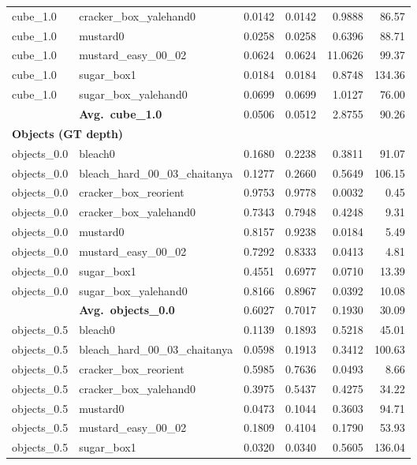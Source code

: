 \begin{longtable}{llrrrr}
  cube_1.0 & cracker\_box\_yalehand0 & 0.0142 & 0.0142 & 0.9888 & 86.57 \\
  cube_1.0 & mustard0 & 0.0258 & 0.0258 & 0.6396 & 88.71 \\
  cube_1.0 & mustard\_easy\_00\_02 & 0.0624 & 0.0624 & 11.0626 & 99.37 \\
  cube_1.0 & sugar\_box1 & 0.0184 & 0.0184 & 0.8748 & 134.36 \\
  cube_1.0 & sugar\_box\_yalehand0 & 0.0699 & 0.0699 & 1.0127 & 76.00 \\
  \cmidrule{2-6}
  & \textbf{Avg.~cube_1.0} & 0.0506 & 0.0512 & 2.8755 & 90.26 \\
  \midrule
\multicolumn{6}{l}{\textbf{Objects (GT depth)}} \\
\midrule
  objects_0.0 & bleach0 & 0.1680 & 0.2238 & 0.3811 & 91.07 \\
  objects_0.0 & bleach\_hard\_00\_03\_chaitanya & 0.1277 & 0.2660 & 0.5649 & 106.15 \\
  objects_0.0 & cracker\_box\_reorient & 0.9753 & 0.9778 & 0.0032 & 0.45 \\
  objects_0.0 & cracker\_box\_yalehand0 & 0.7343 & 0.7948 & 0.4248 & 9.31 \\
  objects_0.0 & mustard0 & 0.8157 & 0.9238 & 0.0184 & 5.49 \\
  objects_0.0 & mustard\_easy\_00\_02 & 0.7292 & 0.8333 & 0.0413 & 4.81 \\
  objects_0.0 & sugar\_box1 & 0.4551 & 0.6977 & 0.0710 & 13.39 \\
  objects_0.0 & sugar\_box\_yalehand0 & 0.8166 & 0.8967 & 0.0392 & 10.08 \\
  \cmidrule{2-6}
  & \textbf{Avg.~objects_0.0} & 0.6027 & 0.7017 & 0.1930 & 30.09 \\
  \midrule
  objects_0.5 & bleach0 & 0.1139 & 0.1893 & 0.5218 & 45.01 \\
  objects_0.5 & bleach\_hard\_00\_03\_chaitanya & 0.0598 & 0.1913 & 0.3412 & 100.63 \\
  objects_0.5 & cracker\_box\_reorient & 0.5985 & 0.7636 & 0.0493 & 8.66 \\
  objects_0.5 & cracker\_box\_yalehand0 & 0.3975 & 0.5437 & 0.4275 & 34.22 \\
  objects_0.5 & mustard0 & 0.0473 & 0.1044 & 0.3603 & 94.71 \\
  objects_0.5 & mustard\_easy\_00\_02 & 0.1809 & 0.4104 & 0.1790 & 53.93 \\
  objects_0.5 & sugar\_box1 & 0.0320 & 0.0340 & 0.5605 & 136.04 \\

\end{longtable}

